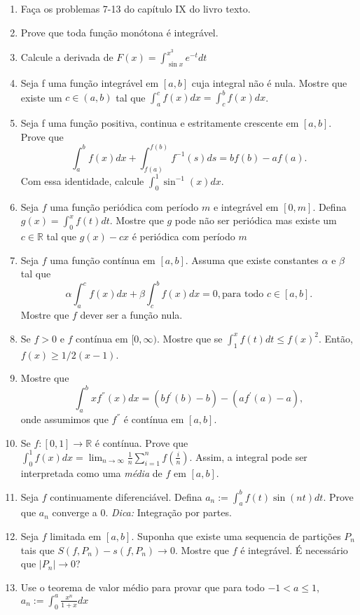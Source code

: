 \documentclass{article}
\theoremstyle{plain}
\theoremstyle{definition}
\theoremstyle{remark}
\begin{document}
\begin{enumerate}
  \item Faça os problemas 7-13 do capítulo IX do livro texto. 
  \item Prove que toda função monótona é integrável.
  \item Calcule a derivada de $F(x)=\int_{\sin x}^{x^3} e^{-t}dt$
  \item Seja f uma função integrável em $[a,b]$
  cuja integral não é nula. Mostre que existe um 
  $c \in (a,b)$
  tal que $\int_{a}^{c} f(x)dx=\int_{c}^{b} f(x)dx$.
  \item Seja f uma função positiva, continua e estritamente crescente em $[a,b]$. Prove que 
  $$ \int_{a}^{b} f(x)dx+\int_{f(a)}^{f(b)} f^{-1}(s)ds=bf(b)-af(a).$$
  Com essa identidade, calcule $\int_{0}^{1} \sin^{-1}(x)dx$. 
  \item Seja $f$ uma função periódica com período $m$ e integrável 
  em $[0,m]$. Defina $g(x)=\int_{0}^{x} f(t)dt$. Mostre que 
  $g$ pode não ser periódica  mas existe um $c \in \mathbb{R}$ 
  tal que $g(x)-cx$ é periódica com período $m$
  \item Seja $f$ uma função contínua em $[a,b]$. Assuma que existe constantes $\alpha$ e $\beta$ tal que 
  $$ \alpha \int_{a}^{c}f(x)dx+\beta \int_{c}^{b} f(x)dx=0, \text{para todo } c \in [a,b].$$
  Mostre que $f$ dever ser a função nula.
  \item Se $f>0$ e $f$ contínua em $[0,\infty)$. Mostre que 
  se $\int_{1}^{x}f(t)dt \leq f(x)^{2}$. Então, 
  $f(x)\geq 1/2(x-1)$.  
  \item Mostre que $$ \int_{a}^{b} xf^{''}(x)dx=(bf^{'}(b)-b)-(af^{'}(a)-a), $$ 
 onde assumimos que $f^{''}$ é contínua em $[a,b]$.
  \item Se $f:[0,1]\rightarrow \mathbb{R}$ é contínua. Prove que 
  $\int_{0}^{1} f(x)dx=\lim_{n \rightarrow \infty} \frac{1}{n}\sum_{i=1}^{n}f(\frac{i}{n})$.
  Assim, a integral pode ser interpretada como uma {\it média} de $f$ em $[a,b]$.  
  \item Seja $f$ continuamente diferenciável. 
  Defina $a_{n}:=\int_{a}^{b} f(t)\sin(nt)dt$. Prove que $a_{n}$ converge a $0$.
  {\it Dica: } Integração por partes.
  \item Seja $f$ limitada em $[a,b]$. Suponha que existe uma sequencia de partições $P_{n}$ tais que  
  $S(f, P_{n})-s(f,P_{n})\rightarrow 0$. Mostre que $f$ é integrável. É necessário que $|P_n|\rightarrow 0$?
  \item Use o teorema de valor médio para provar que para 
  todo $-1<a\leq 1$, $a_{n}:=\int_{0}^{a} \frac{x^{n}}{1+x}dx$

\end{enumerate}
\end{document}
